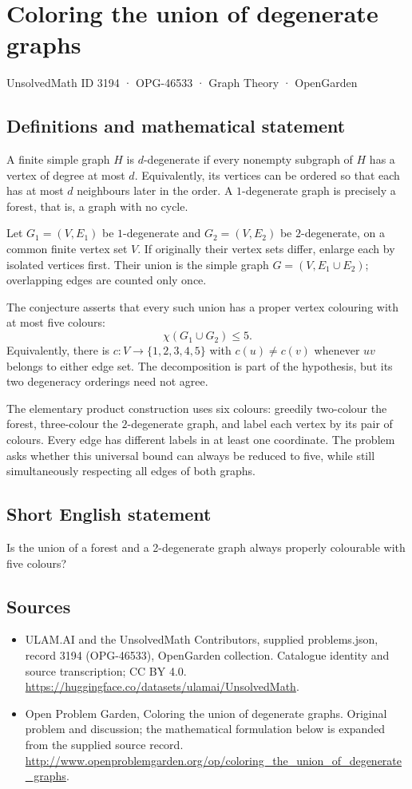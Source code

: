 \documentclass[11pt,a4paper]{article}
\begin{document}
\section*{Coloring the union of degenerate graphs}\label{3194}
{\small UnsolvedMath ID 3194 · OPG-46533 · Graph Theory · OpenGarden}
\subsection{Definitions and mathematical statement}
A finite simple graph $H$ is $d$-degenerate if every
nonempty subgraph of $H$ has a vertex of degree at
most $d$. Equivalently, its vertices can be ordered
so that each has at most $d$ neighbours later in
the order. A $1$-degenerate graph is precisely a
forest, that is, a graph with no cycle.

Let $G_1=(V,E_1)$ be $1$-degenerate and
$G_2=(V,E_2)$ be $2$-degenerate, on a common finite
vertex set $V$. If originally their vertex sets
differ, enlarge each by isolated vertices first.
Their union is the simple graph
$G=(V,E_1\cup E_2)$; overlapping edges are counted
only once.

The conjecture asserts that every such union has
a proper vertex colouring with at most five colours:
\[
 \chi(G_1\cup G_2)\leq5.
\]
Equivalently, there is $c:V\to\{1,2,3,4,5\}$
with $c(u)\neq c(v)$ whenever $uv$ belongs to
either edge set. The decomposition is part of
the hypothesis, but its two degeneracy orderings
need not agree.

The elementary product construction uses six
colours: greedily two-colour the forest, three-colour
the $2$-degenerate graph, and label each vertex
by its pair of colours. Every edge has different
labels in at least one coordinate. The problem
asks whether this universal bound can always be
reduced to five, while still simultaneously
respecting all edges of both graphs.
\subsection{Short English statement}
Is the union of a forest and a 2-degenerate graph always properly colourable with five colours?
\subsection{Sources}
\begin{itemize}
\item[S1] ULAM.AI and the UnsolvedMath Contributors, supplied problems.json, record 3194 (OPG-46533), OpenGarden collection. Catalogue identity and source transcription; CC BY 4.0.
\url{https://huggingface.co/datasets/ulamai/UnsolvedMath}.
\item[S2] Open Problem Garden, Coloring the union of degenerate graphs. Original problem and discussion; the mathematical formulation below is expanded from the supplied source record.
\url{http://www.openproblemgarden.org/op/coloring_the_union_of_degenerate_graphs}.
\end{itemize}
\end{document}
